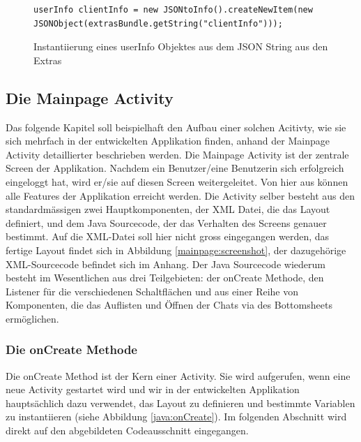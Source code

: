 \documentclass[a4paper,11pt]{report}
\begin{document}
\begin{figure}
	\begin{center}
		\begin{verbatim}
userInfo clientInfo = new JSONtoInfo().createNewItem(new JSONObject(extrasBundle.getString("clientInfo")));
		\end{verbatim}
	\caption{Instantiierung eines userInfo Objektes aus dem JSON String aus den Extras}\label{java:instanzUserInfo}
	\end{center}
\end{figure}

			\subsection{Die Mainpage Activity}
			Das folgende Kapitel soll beispielhaft den Aufbau einer solchen Acitivty, wie sie sich mehrfach in der entwickelten Applikation finden, anhand der Mainpage Activity detaillierter beschrieben werden. Die Mainpage Activity ist der zentrale Screen der Applikation. Nachdem ein Benutzer/eine Benutzerin sich erfolgreich eingeloggt hat, wird er/sie auf diesen Screen weitergeleitet. Von hier aus können alle Features der Applikation erreicht werden. Die Activity selber besteht aus den standardmässigen zwei Hauptkomponenten, der XML Datei, die das Layout definiert, und dem Java Sourcecode, der das Verhalten des Screens genauer bestimmt. Auf die XML-Datei soll hier nicht gross eingegangen werden, das fertige Layout findet sich in Abbildung \ref{mainpage:screenshot}, der dazugehörige XML-Sourcecode befindet sich im Anhang. Der Java Sourcecode wiederum besteht im Wesentlichen aus drei Teilgebieten: der onCreate Methode, den Listener für die verschiedenen Schaltflächen und aus einer Reihe von Komponenten, die das Auflisten und Öffnen der Chats via des Bottomsheets ermöglichen.
			
			\subsubsection{Die onCreate Methode}
			Die onCreate Method ist der Kern einer Activity. Sie wird aufgerufen, wenn eine neue Activity gestartet wird und wir in der entwickelten Applikation hauptsächlich dazu verwendet, das Layout zu definieren und bestimmte Variablen zu instantiieren (siehe Abbildung \ref{java:onCreate}). Im folgenden Abschnitt wird direkt auf den abgebildeten Codeausschnitt eingegangen.
			
\end{document}
